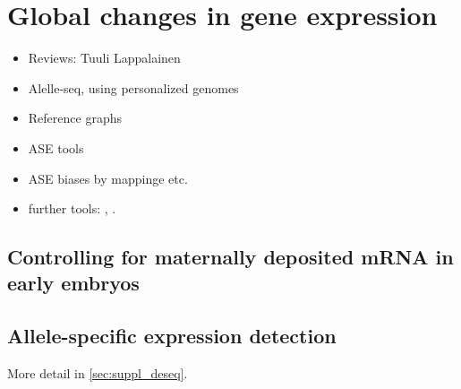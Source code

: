 \section{Global changes in gene expression}
\label{sec:ase}


\begin{itemize}
\item Reviews: Tuuli Lappalainen \citep{Castel2015}
\item Alelle-seq, using personalized genomes \citep{Rozowsky2014}
\item Reference graphs \citep{Dilthey2015,Marschall2016,Novak101378}
\item ASE tools \citep{Skelly2011,Mayba2014,Harvey2014,Pirinen2015,Romanel2015,VandeGeijn2015,Liu2016}
\item ASE biases by mappinge etc. \citep{Degner2009,Stevenson2013}
\item further tools: \deseq, \STAR.
\end{itemize}


\subsection{Controlling for maternally deposited mRNA in early embryos}
\label{sec:maternalRNA}



\subsection{Allele-specific expression detection}
\label{sec:ase_impl}


More detail in \cref{sec:suppl_deseq}.

